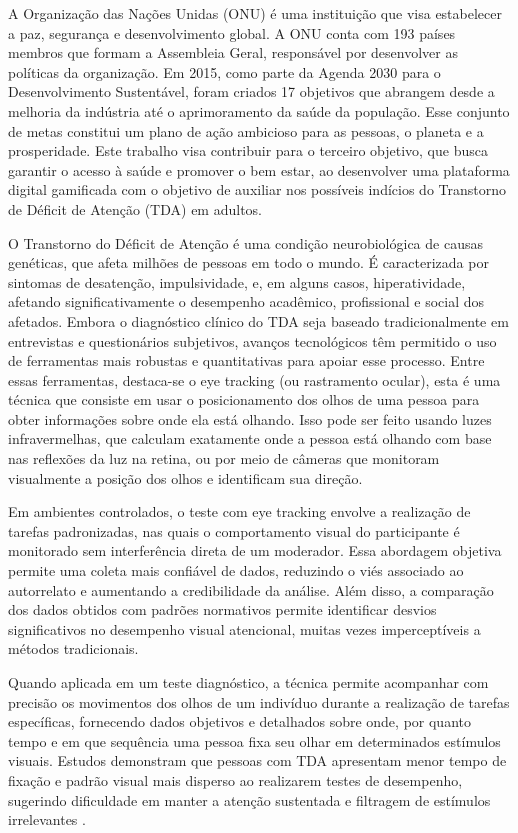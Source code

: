 A Organização das Nações Unidas (ONU) é uma instituição que visa estabelecer a paz,
segurança e desenvolvimento global. A ONU conta com 193 países membros que formam a
Assembleia Geral, responsável por desenvolver as políticas da organização. Em 2015, como
parte da Agenda 2030 para o Desenvolvimento Sustentável, foram criados 17 objetivos que
abrangem desde a melhoria da indústria até o aprimoramento da saúde da população. Esse
conjunto de metas constitui um plano de ação ambicioso para as pessoas, o planeta e a
prosperidade. Este trabalho visa contribuir para o terceiro objetivo, que busca garantir o
acesso à saúde e promover o bem estar, ao desenvolver uma plataforma digital gamificada
com o objetivo de auxiliar nos possíveis indícios do Transtorno de Déficit de Atenção (TDA)
em adultos.

O Transtorno do Déficit de Atenção é uma condição neurobiológica de causas
genéticas, que afeta milhões de pessoas em todo o mundo. É caracterizada por sintomas de
desatenção, impulsividade, e, em alguns casos, hiperatividade, afetando significativamente o
desempenho acadêmico, profissional e social dos afetados. Embora o diagnóstico clínico do
TDA seja baseado tradicionalmente em entrevistas e questionários subjetivos, avanços
tecnológicos têm permitido o uso de ferramentas mais robustas e quantitativas para apoiar
esse processo. \textcite{BVS2014}
Entre essas ferramentas, destaca-se o eye tracking (ou rastramento ocular), esta é uma técnica
que consiste em usar o posicionamento dos olhos de uma pessoa para obter informações
sobre onde ela está olhando. Isso pode ser feito usando luzes infravermelhas, que calculam
exatamente onde a pessoa está olhando com base nas reflexões da luz na retina, ou por
meio de câmeras que monitoram visualmente a posição dos olhos e identificam sua direção.

Em ambientes controlados, o teste com eye tracking envolve a realização de tarefas
padronizadas, nas quais o comportamento visual do participante é monitorado sem
interferência direta de um moderador. Essa abordagem objetiva permite uma coleta mais
confiável de dados, reduzindo o viés associado ao autorrelato e aumentando a credibilidade
da análise. Além disso, a comparação dos dados obtidos com padrões normativos permite
identificar desvios significativos no desempenho visual atencional, muitas vezes
imperceptíveis a métodos tradicionais.

Quando aplicada em um teste diagnóstico, a técnica permite acompanhar com
precisão os movimentos dos olhos de um indivíduo durante a realização de tarefas
específicas, fornecendo dados objetivos e detalhados sobre onde, por quanto tempo e em
que sequência uma pessoa fixa seu olhar em determinados estímulos visuais. Estudos
demonstram que pessoas com TDA apresentam menor tempo de fixação e padrão visual
mais disperso ao realizarem testes de desempenho, sugerindo dificuldade em manter a
atenção sustentada e filtragem de estímulos irrelevantes \textcite{Lim2024}.

